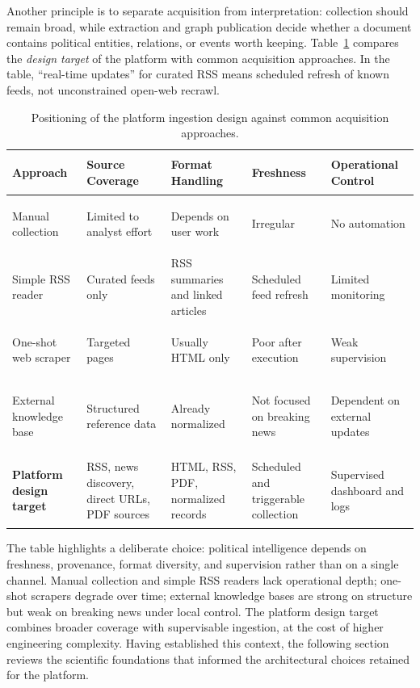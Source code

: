 Another principle is to separate acquisition from interpretation: collection should remain broad, while extraction and graph publication decide whether a document contains political entities, relations, or events worth keeping. Table~\ref{tab:crawler-positioning} compares the \emph{design target} of the platform with common acquisition approaches. In the table, ``real-time updates'' for curated RSS means scheduled refresh of known feeds, not unconstrained open-web recrawl.

\begin{table}[H]
\centering
\scriptsize
\renewcommand{\arraystretch}{1.25}
\begin{tabularx}{\textwidth}{@{}>{\bfseries\raggedright\arraybackslash}p{3.1cm}XXXX@{}}
\toprule
\rowcolor{lightblue}
Approach & Source Coverage & Format Handling & Freshness & Operational Control \\
\midrule
Manual collection & Limited to analyst effort & Depends on user work & Irregular & No automation \\
Simple RSS reader & Curated feeds only & RSS summaries and linked articles & Scheduled feed refresh & Limited monitoring \\
One-shot web scraper & Targeted pages & Usually HTML only & Poor after execution & Weak supervision \\
External knowledge base & Structured reference data & Already normalized & Not focused on breaking news & Dependent on external updates \\
\textbf{Platform design target} & RSS, news discovery, direct URLs, PDF sources & HTML, RSS, PDF, normalized records & Scheduled and triggerable collection & Supervised dashboard and logs \\
\bottomrule
\end{tabularx}
\caption{Positioning of the platform ingestion design against common acquisition approaches.}
\label{tab:crawler-positioning}
\end{table}

The table highlights a deliberate choice: political intelligence depends on freshness, provenance, format diversity, and supervision rather than on a single channel. Manual collection and simple RSS readers lack operational depth; one-shot scrapers degrade over time; external knowledge bases are strong on structure but weak on breaking news under local control. The platform design target combines broader coverage with supervisable ingestion, at the cost of higher engineering complexity. Having established this context, the following section reviews the scientific foundations that informed the architectural choices retained for the platform.

